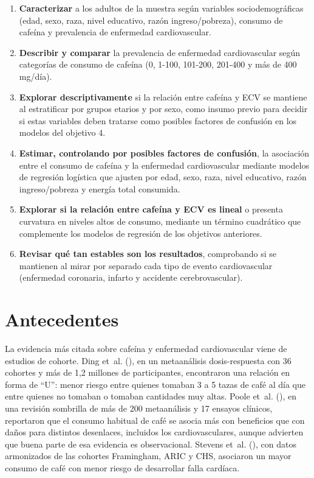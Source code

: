 \documentclass[
  spanish,
  12pt,
]{article}
\begin{document}
\begin{enumerate}
\def\labelenumi{\arabic{enumi}.}
\item
  \textbf{Caracterizar} a los adultos de la muestra según variables
  sociodemográficas (edad, sexo, raza, nivel educativo, razón
  ingreso/pobreza), consumo de cafeína y prevalencia de enfermedad
  cardiovascular.
\item
  \textbf{Describir y comparar} la prevalencia de enfermedad cardiovascular
  según categorías de consumo de cafeína (0, 1-100, 101-200, 201-400 y
  más de 400 mg/día).
\item
  \textbf{Explorar descriptivamente} si la relación entre cafeína y ECV se
  mantiene al estratificar por grupos etarios y por sexo, como
  insumo previo para decidir si estas variables deben tratarse como
  posibles factores de confusión en los modelos del objetivo 4.
\item
  \textbf{Estimar, controlando por posibles factores de confusión}, la
  asociación entre el consumo de cafeína y la enfermedad
  cardiovascular mediante modelos de regresión logística que ajusten
  por edad, sexo, raza, nivel educativo, razón ingreso/pobreza y
  energía total consumida.
\item
  \textbf{Explorar si la relación entre cafeína y ECV es lineal} o
  presenta curvatura en niveles altos de consumo, mediante un término
  cuadrático que complemente los modelos de regresión de los
  objetivos anteriores.
\item
  \textbf{Revisar qué tan estables son los resultados}, comprobando si se
  mantienen al mirar por separado cada tipo de evento cardiovascular
  (enfermedad coronaria, infarto y accidente cerebrovascular).
\end{enumerate}

\section{Antecedentes}\label{antecedentes}

La evidencia más citada sobre cafeína y enfermedad cardiovascular viene
de estudios de cohorte. Ding et~al. (), en un metaanálisis
dosis-respuesta con 36 cohortes y más de 1,2 millones de participantes,
encontraron una relación en forma de ``U'': menor riesgo entre quienes
tomaban 3 a 5 tazas de café al día que entre quienes no tomaban o
tomaban cantidades muy altas. Poole et~al. (), en una revisión
sombrilla de más de 200 metaanálisis y 17 ensayos clínicos, reportaron
que el consumo habitual de café se asocia más con beneficios que con
daños para distintos desenlaces, incluidos los cardiovasculares, aunque
advierten que buena parte de esa evidencia es observacional.
Stevens et~al. (), con datos armonizados de las cohortes Framingham,
ARIC y CHS, asociaron un mayor consumo de café con menor riesgo de
desarrollar falla cardíaca.
\end{document}
